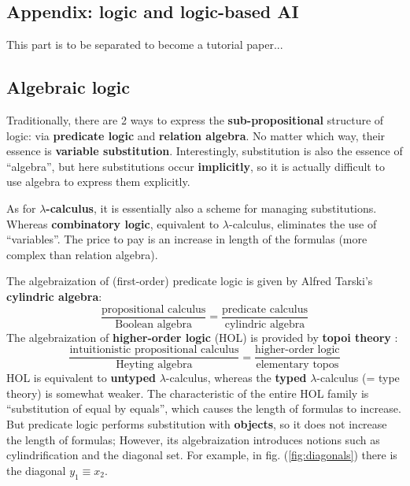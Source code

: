 \documentclass[orivec]{llncs}
\begin{document}
\begin{tcolorbox}
\setlength{\parskip}{2.8ex}

\section*{Appendix: logic and logic-based AI}
\renewcommand{\thesection}{A}

This part is to be separated to become a tutorial paper...

\setcounter{subsection}{0}
\subsection{Algebraic logic}

Traditionally, there are 2 ways to express the \textbf{sub-propositional} structure of logic:  via \textbf{predicate logic} and \textbf{relation algebra}.  No matter which way, their essence is \textbf{variable substitution}.  Interestingly, substitution is also the essence of ``algebra'', but here substitutions occur \textbf{implicitly}, so it is actually difficult to use algebra to express them explicitly.

As for \textbf{$\lambda$-calculus}, it is essentially also a scheme for managing substitutions.  Whereas \textbf{combinatory logic}, equivalent to $\lambda$-calculus, eliminates the use of ``variables''.  The price to pay is an increase in length of the formulas (more complex than relation algebra).

The algebraization of (first-order) predicate logic is given by Alfred Tarski's \textbf{cylindric algebra}:
\begin{equation}
\frac{\mbox{propositional calculus}}{\mbox{Boolean algebra}} = \frac{\mbox{predicate calculus}}{\mbox{cylindric algebra}}
\end{equation}
The algebraization of \textbf{higher-order logic} (HOL) is provided by \textbf{topoi theory} \cite{Lambek1988} \cite{MacLane1992}:
\begin{equation}
\frac{\mbox{intuitionistic propositional calculus}}{\mbox{Heyting algebra}} = \frac{\mbox{higher-order logic}}{\mbox{elementary topos}}
\end{equation}
HOL is equivalent to \textbf{untyped} $\lambda$-calculus, whereas the \textbf{typed} $\lambda$-calculus (= type theory) is somewhat weaker.  The characteristic of the entire HOL family is ``substitution of equal by equals'', which causes the length of formulas to increase.  But predicate logic performs substitution with \textbf{objects}, so it does not increase the length of formulas;  However, its algebraization introduces notions such as cylindrification and the diagonal set.  For example, in fig. (\ref{fig:diagonals}) there is the diagonal $y_1 \equiv x_2$.


\end{tcolorbox}
\end{document}
